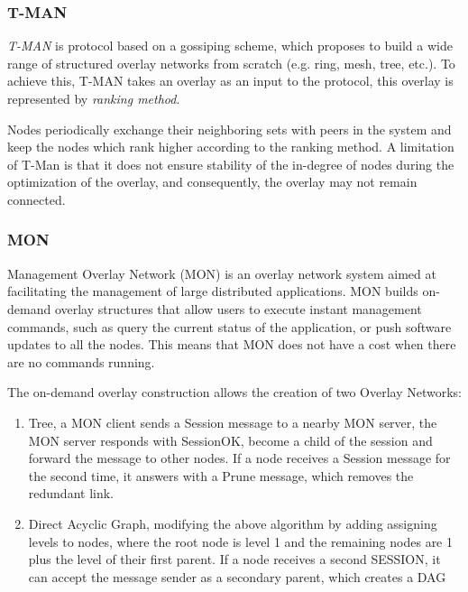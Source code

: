 \subsubsection*{T-MAN}

\textit{T-MAN} \cite{jelasity2005t} is protocol based on a gossiping scheme, which proposes to build a wide range of structured overlay networks from scratch (e.g. ring, mesh, tree, etc.). To achieve this, T-MAN takes an overlay as an input to the protocol, this overlay is represented by \textit{ranking method}. 

Nodes periodically exchange their neighboring sets with peers in the system and keep the nodes which rank higher according to the ranking method. A limitation of T-Man is that it does not ensure stability of the in-degree of nodes during the optimization of the overlay, and consequently, the overlay may not remain connected. 

\subsubsection*{MON}

Management Overlay Network \cite{liang2005mon} (MON) is an overlay network system aimed at facilitating the management of large distributed applications.
MON builds on-demand overlay structures that allow users to execute instant management commands, such as query the current status of the application, or push software updates to all the nodes. This means that MON does not have a cost when there are no commands running.

The on-demand overlay construction allows the creation of two Overlay Networks: 

\begin{enumerate}
    \item Tree, a MON client sends a Session message to a nearby MON server, the MON server responds with SessionOK, become a child of the session and forward the message to other nodes. If a node receives a Session message for the second time, it answers with a Prune message, which removes the redundant link.
    
    \item Direct Acyclic Graph, modifying the above algorithm by adding assigning levels to nodes, where the root node is level 1 and the remaining nodes are 1 plus the level of their first parent. If a node receives a second SESSION, it can accept the message sender as a secondary parent, which creates a DAG
\end{enumerate}

